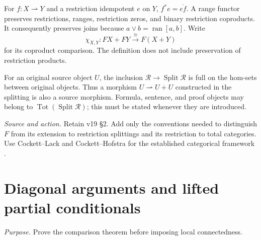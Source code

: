 \documentclass[11pt]{article}
\theoremstyle{definition}\newtheorem{definition}[theorem]{Definition}
\newcommand{\Tot}{\operatorname{Tot}}
\newcommand{\Split}{\operatorname{Split}}
\newcommand{\ran}{\operatorname{ran}}
\newcommand{\R}{\mathscr R}
\newcommand{\source}[1]{\par\smallskip\noindent\textit{Source and action.} #1\par\smallskip}
\newcommand{\purpose}[1]{\noindent\textit{Purpose.} #1\par\medskip}
\begin{document}
For $f:X\rightharpoonup Y$ and a restriction idempotent $e$ on $Y$,
$f^*e=\overline{ef}$. A range functor preserves restrictions, ranges,
restriction zeros, and binary restriction coproducts. It consequently
preserves joins because $a\vee b=\ran[a,b]$. Write
\[
 \chi_{X,Y}:FX+FY\xrightarrow{\cong}F(X+Y)
\]
for its coproduct comparison. The definition does not include preservation
of restriction products.

For an original source object $U$, the inclusion
$\R\to\Split\R$ is full on the hom-sets between original objects.
Thus a morphism $U\rightharpoonup U+U$ constructed in the splitting is
also a source morphism. Formula, sentence, and proof objects may belong
to $\Tot(\Split\R)$; this must be stated whenever they are introduced.
\source{Retain v19 \S2. Add only the conventions needed to distinguish $F$ from its extension to restriction splittings and its restriction to total categories. Use Cockett--Lack and Cockett--Hofstra for the established categorical framework \cite{CockettLack,CockettHofstra}.}

\section{Diagonal arguments and lifted partial conditionals}
\purpose{Prove the comparison theorem before imposing local connectedness.}
\end{document}
